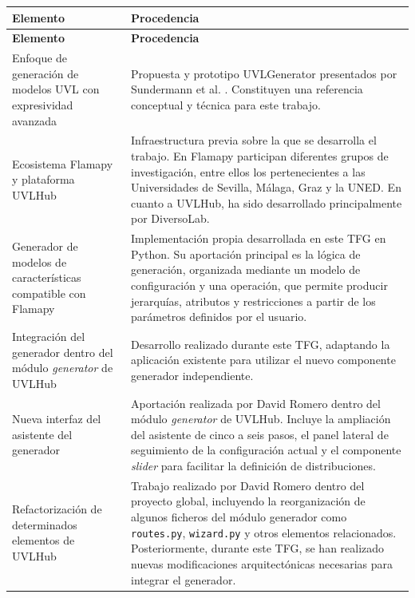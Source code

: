 \begin{longtable}{@{}>{\raggedright\arraybackslash}p{5cm}
>{\raggedright\arraybackslash}p{\dimexpr\textwidth-5cm-2\tabcolsep\relax}@{}}
\toprule
\textbf{Elemento} & \textbf{Procedencia} \\
\midrule
\endfirsthead
\toprule
\textbf{Elemento} & \textbf{Procedencia} \\
\midrule
\endhead

Enfoque de generación de modelos UVL con expresividad avanzada &
Propuesta y prototipo UVLGenerator presentados por Sundermann et al.
\cite{sundermann2024generating}. Constituyen una referencia conceptual y
técnica para este trabajo. \\

Ecosistema Flamapy y plataforma UVLHub &
Infraestructura previa sobre la que se desarrolla el trabajo. En Flamapy participan diferentes grupos de investigación, entre ellos los pertenecientes a las Universidades de Sevilla, Málaga, Graz y la UNED. En cuanto a UVLHub, ha sido desarrollado principalmente por DiversoLab. \\

Generador de modelos de características compatible con Flamapy &
Implementación propia desarrollada en este TFG en Python. Su aportación
principal es la lógica de generación, organizada mediante un modelo de
configuración y una operación, que permite producir jerarquías, atributos y
restricciones a partir de los parámetros definidos por el usuario. \\

Integración del generador dentro del módulo \textit{generator} de UVLHub &
Desarrollo realizado durante este TFG, adaptando la aplicación existente para
utilizar el nuevo componente generador independiente. \\

Nueva interfaz del asistente del generador &
Aportación realizada por David Romero dentro del módulo
\textit{generator} de UVLHub. Incluye la ampliación del asistente de cinco a seis
pasos, el panel lateral de seguimiento de la configuración actual y el componente
\textit{slider} para facilitar la definición de distribuciones. \\

Refactorización de determinados elementos de UVLHub &
Trabajo realizado por David Romero dentro del proyecto global, incluyendo la
reorganización de algunos ficheros del módulo generador como
\texttt{routes.py}, \texttt{wizard.py} y otros elementos relacionados. Posteriormente, durante este TFG, se han realizado nuevas modificaciones arquitectónicas necesarias para integrar el generador.\\


\end{longtable}
